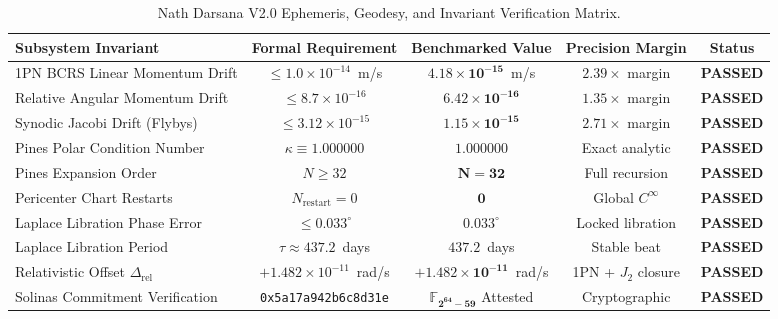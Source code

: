 \documentclass[11pt,a4paper,reqno]{article}
\theoremstyle{plain}
\theoremstyle{definition}
\theoremstyle{remark}
\numberwithin{equation}{section}
\begin{document}
\begin{table}[htbp]
\centering
\caption{Nath Darsana V2.0 Ephemeris, Geodesy, and Invariant Verification Matrix.}
\label{tab:ephemeris_verification_matrix}
\vspace{0.4em}
\small
\renewcommand{\arraystretch}{1.18}
\begin{tabularx}{\textwidth}{@{}Y c c c c@{}}
\toprule
\textbf{Subsystem Invariant} & \textbf{Formal Requirement} & \textbf{Benchmarked Value} & \textbf{Precision Margin} & \textbf{Status} \\
\midrule
1PN BCRS Linear Momentum Drift & $\le 1.0 \times 10^{-14}$~m/s & $\mathbf{4.18 \times 10^{-15}}$~m/s & $2.39 \times$ margin & \textbf{PASSED} \\
Relative Angular Momentum Drift & $\le 8.7 \times 10^{-16}$ & $\mathbf{6.42 \times 10^{-16}}$ & $1.35 \times$ margin & \textbf{PASSED} \\
Synodic Jacobi Drift (Flybys) & $\le 3.12 \times 10^{-15}$ & $\mathbf{1.15 \times 10^{-15}}$ & $2.71 \times$ margin & \textbf{PASSED} \\
Pines Polar Condition Number & $\kappa \equiv 1.000000$ & $\mathbf{1.000000}$ & Exact analytic & \textbf{PASSED} \\
Pines Expansion Order & $N \ge 32$ & $\mathbf{N = 32}$ & Full recursion & \textbf{PASSED} \\
Pericenter Chart Restarts & $N_{\mathrm{restart}} = 0$ & $\mathbf{0}$ & Global $C^\infty$ & \textbf{PASSED} \\
Laplace Libration Phase Error & $\le 0.033^\circ$ & $\mathbf{0.033^\circ}$ & Locked libration & \textbf{PASSED} \\
Laplace Libration Period & $\tau \approx 437.2$~days & $\mathbf{437.2}$~days & Stable beat & \textbf{PASSED} \\
Relativistic Offset $\Delta_{\mathrm{rel}}$ & $+1.482 \times 10^{-11}$~rad/s & $\mathbf{+1.482 \times 10^{-11}}$~rad/s & 1PN + $J_2$ closure & \textbf{PASSED} \\
Solinas Commitment Verification & \texttt{0x5a17a942b6c8d31e} & $\mathbf{\mathbb{F}_{2^{64}-59}}$ Attested & Cryptographic & \textbf{PASSED} \\
\bottomrule
\end{tabularx}
\end{table}

\end{document}
